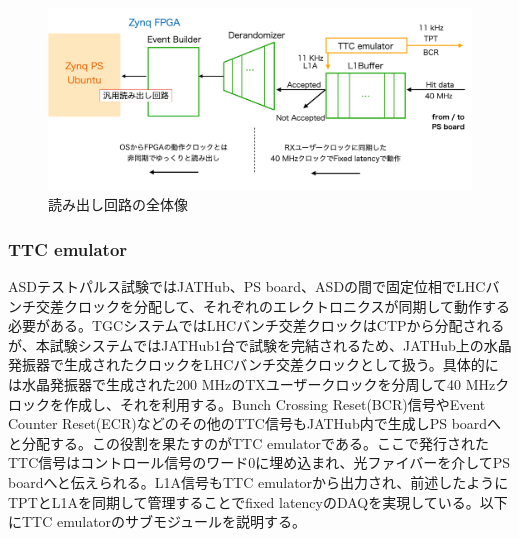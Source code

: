 \begin{figure} 
\centering
\includegraphics[width=16cm]{fig/QAQC/JATHubdaq.png}
\caption[読み出し回路の全体像]{読み出し回路の全体像}
\label{JATHubdaq}
\end{figure}

\subsubsection{TTC emulator} \par
ASDテストパルス試験ではJATHub、PS board、ASDの間で固定位相でLHCバンチ交差クロックを分配して、それぞれのエレクトロニクスが同期して動作する必要がある。TGCシステムではLHCバンチ交差クロックはCTPから分配されるが、本試験システムではJATHub1台で試験を完結されるため、JATHub上の水晶発振器で生成されたクロックをLHCバンチ交差クロックとして扱う。具体的には水晶発振器で生成された200 MHzのTXユーザークロックを分周して40 MHzクロックを作成し、それを利用する。Bunch Crossing Reset(BCR)信号やEvent Counter Reset(ECR)などのその他のTTC信号もJATHub内で生成しPS boardへと分配する。この役割を果たすのがTTC emulatorである。ここで発行されたTTC信号はコントロール信号のワード0に埋め込まれ、光ファイバーを介してPS boardへと伝えられる。L1A信号もTTC emulatorから出力され、前述したようにTPTとL1Aを同期して管理することでfixed latencyのDAQを実現している。以下にTTC emulatorのサブモジュールを説明する。
\baselineskip


